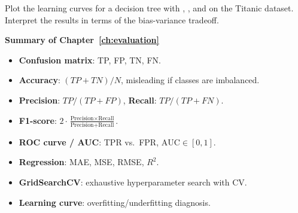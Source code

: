 \begin{exercise}[$\star\star\star$]
Plot the learning curves for a decision tree with , , and  on the Titanic dataset. Interpret the results in terms of the bias-variance tradeoff.
\end{exercise}

\begin{keyformulas}
\textbf{Summary of Chapter~\ref{ch:evaluation}}
\begin{itemize}
    \item \textbf{Confusion matrix}: TP, FP, TN, FN.
    \item \textbf{Accuracy}: $(TP + TN) / N$, misleading if classes are imbalanced.
    \item \textbf{Precision}: $TP / (TP + FP)$, \textbf{Recall}: $TP / (TP + FN)$.
    \item \textbf{F1-score}: $2 \cdot \frac{\text{Precision} \times \text{Recall}}{\text{Precision} + \text{Recall}}$.
    \item \textbf{ROC curve / AUC}: TPR vs.\ FPR, $\text{AUC} \in [0, 1]$.
    \item \textbf{Regression}: MAE, MSE, RMSE, $R^2$.
    \item \textbf{GridSearchCV}: exhaustive hyperparameter search with CV.
    \item \textbf{Learning curve}: overfitting/underfitting diagnosis.
\end{itemize}
\end{keyformulas}
